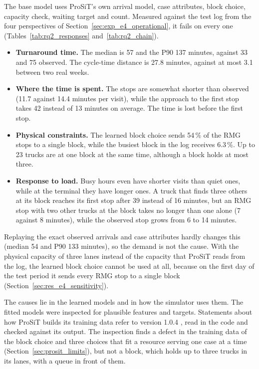 The base model uses ProSiT's own arrival model, case attributes, block choice,
capacity check, waiting target and count. Measured against the test log from the four
perspectives of Section~\ref{sec:exp_e4_operational}, it fails on every one
(Tables~\ref{tab:rq2_responses} and~\ref{tab:rq2_chain}).
\begin{itemize}
\item \textbf{Turnaround time.} The median is 57 and the P90 137 minutes, against 33
and 75 observed. The cycle-time distance is 27.8 minutes, against at most 3.1 between
two real weeks.
\item \textbf{Where the time is spent.} The stops are somewhat shorter than observed
(11.7 against 14.4 minutes per visit), while the approach to the first stop takes 42
instead of 13 minutes on average. The time is lost before the first stop.
\item \textbf{Physical constraints.} The learned block choice sends 54\,\% of the RMG
stops to a single block, while the busiest block in the log receives 6.3\,\%. Up to
23 trucks are at one block at the same time, although a block holds at most three.
\item \textbf{Response to load.} Busy hours even have shorter visits than quiet
ones, while at the terminal they have longer ones. A truck that finds three others at its block reaches its
first stop after 39 instead of 16 minutes, but an RMG stop with two other trucks at
the block takes no longer than one alone (7 against 8 minutes), while the observed
stop grows from 6 to 14 minutes.
\end{itemize}
Replaying the exact observed arrivals and case attributes hardly changes this (median
54 and P90 133 minutes), so the demand is not the cause. With the physical capacity
of three lanes instead of the capacity that ProSiT reads from the log, the learned
block choice
cannot be used at all, because on the first day of the test period it sends every RMG
stop to a single block (Section~\ref{sec:res_e4_sensitivity}).

The causes lie in the learned models and in how the simulator uses them. The fitted
models were inspected for plausible features and targets. Statements about how
ProSiT builds its training data refer to version 1.0.4 \cite{ProSiTRepository}, read
in the code and checked against its output. The inspection finds a defect in the
training data of the block choice and three choices that fit a resource serving one
case at a time (Section~\ref{sec:prosit_limits}), but not a block, which holds up to
three trucks in its lanes, with a queue in front of them.

